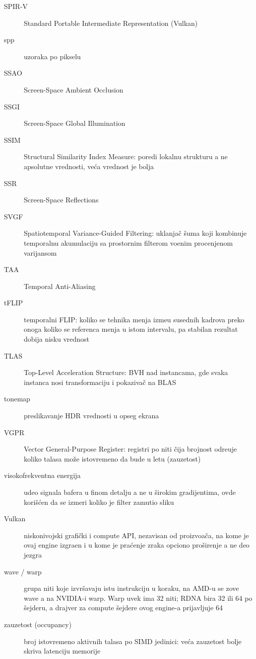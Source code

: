 \begin{description}
  \item[SPIR-V] Standard Portable Intermediate Representation (Vulkan)
  \item[spp] uzoraka po pikselu
  \item[SSAO] Screen-Space Ambient Occlusion
  \item[SSGI] Screen-Space Global Illumination
  \item[SSIM] Structural Similarity Index Measure: poredi lokalnu strukturu a ne apsolutne
    vrednosti, ve\'ca vrednost je bolja
  \item[SSR] Screen-Space Reflections
  \item[SVGF] Spatiotemporal Variance-Guided Filtering: uklanja\v{c} \v{s}uma koji kombinuje
    temporalnu akumulaciju sa prostornim filterom vo\dj enim procenjenom varijansom
  \item[TAA] Temporal Anti-Aliasing
  \item[tFLIP] temporalni FLIP: koliko se tehnika menja izme\dj u susednih kadrova preko onoga koliko
    se referenca menja u istom intervalu, pa stabilan rezultat dobija nisku vrednost
  \item[TLAS] Top-Level Acceleration Structure: BVH nad instancama, gde svaka instanca nosi
    transformaciju i pokaziva\v{c} na BLAS
  \item[tonemap] preslikavanje HDR vrednosti u opseg ekrana
  \item[VGPR] Vector General-Purpose Register: registri po niti \v{c}ija brojnost odre\dj uje koliko
    talasa mo\v{z}e istovremeno da bude u letu (zauzetost)
  \item[visokofrekventna energija] udeo signala bafera u finom detalju a ne u \v{s}irokim
    gradijentima, ovde kori\v{s}\'cen da se izmeri koliko je filter zamutio sliku
  \item[Vulkan] niskonivojski grafi\v{c}ki i compute API, nezavisan od proizvo\dj a\v{c}a, na kome je
    ovaj engine izgra\dj en i u kome je pra\'cenje zraka opciono pro\v{s}irenje a ne deo jezgra
  \item[wave / warp] grupa niti koje izvr\v{s}avaju istu instrukciju u koraku, na AMD-u se zove wave a
    na NVIDIA-i warp. Warp uvek ima 32 niti; RDNA bira 32 ili 64 po \v{s}ejderu, a drajver za compute
    \v{s}ejdere ovog engine-a prijavljuje 64
  \item[zauzetost (occupancy)] broj istovremeno aktivnih talasa po SIMD jedinici: ve\'ca zauzetost
    bolje skriva latenciju memorije
  \end{description}

